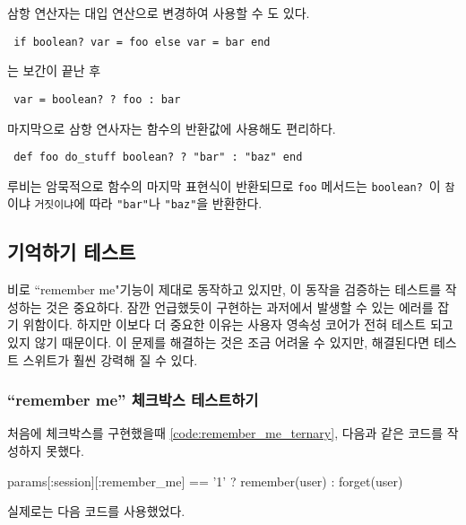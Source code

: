 {{\begin{aside}
\noindent 삼항 연산자는 대입 연산으로 변경하여 사용할 수 도 있다. 

\begin{verbatim} if boolean? var = foo else var = bar end \end{verbatim} 

\noindent 는 보간이 끝난 후 

\begin{verbatim} var = boolean? ? foo : bar \end{verbatim} 

\noindent 마지막으로 삼항 연사자는 함수의 반환값에 사용해도 편리하다. 

\begin{verbatim} def foo do_stuff boolean? ? "bar" : "baz" end \end{verbatim} 

\noindent 루비는 암묵적으로 함수의 마지막 표현식이 반환되므로 \texttt{foo} 메서드는 \texttt{boolean?}\ 이 \texttt{참}이냐 \texttt{거짓이냐}에 따라 \texttt{"bar"}나 \texttt{"baz"}을 반환한다. 

\end{aside} 

\subsection{기억하기 테스트} \label{sec:remember_tests} 

비로 ``remember me"기능이 제대로 동작하고 있지만, 이 동작을 검증하는 테스트를 작성하는 것은 중요하다. 잠깐 언급했듯이 구현하는 과저에서 발생할 수 있는 에러를 잡기 위함이다. 하지만 이보다 더 중요한 이유는 사용자 영속성 코어가 전혀 테스트 되고 있지 않기 때문이다. 이 문제를 해결하는 것은 조금 어려울 수 있지만, 해결된다면 테스트 스위트가 훨씬 강력해 질 수 있다. 

\subsubsection{``remember me'' 체크박스 테스트하기} \label{sec:testing_the_remember_me_box} 

처음에 체크박스를 구현했을때 \ref{code:remember_me_ternary}, 다음과 같은 코드를 작성하지 못했다. 

\begin{code} params[:session][:remember_me] == '1' ? remember(user) : forget(user) \end{code} 

\noindent 실제로는 다음 코드를 사용했었다. 

}}
